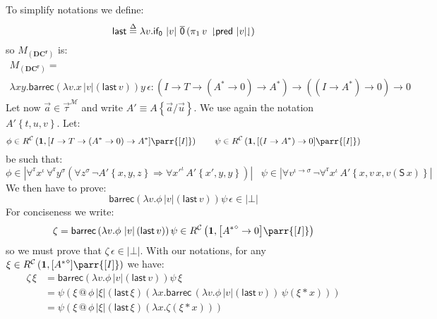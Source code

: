 \documentclass{CSML}
\makeatletter
\newcommand*\Def{\mathrel{\overset{\Delta}{=}}}
\newcommand*\SortA{\sigma}
\newcommand*\SortB{\tau}
\newcommand*\LogSortedTerm[2]{#1^{#2}}
\newcommand*\LogTermA{t}
\newcommand*\LogTermB{u}
\newcommand*\LogTermC{v}
\newcommand*\LogVarA{x}
\newcommand*\LogVarB{y}
\newcommand*\LogVarC{z}
\newcommand*\LogVarD{u}
\newcommand*\LogVarE{v}
\newcommand*\LogConst[1]{\mathsf{#1}}
\newcommand*\LogImp{\mathbin{\Rightarrow}}
\newcommand*\LogBot\bot
\newcommand*\LogForallRel{\forall^\mathrm{r}}
\newcommand*\LogFormA{A}
\newcommand*\LogSubst[1]{\left\{#1\right\}}
\newcommand*\ModM{\mathcal{M}}
\newcommand*\ModElemA{a}
\newcommand*\ModMInterp[1]{{#1}^\ModM}
\newcommand*\LmSortBot0
\newcommand*\LmSortTo\to
\newcommand*\LmSortA{T}
\newcommand*\LmTerm[2]{#1\mathrel{:}#2}
\newcommand*\LmVarA{x}
\newcommand*\LmVarB{y}
\newcommand*\LmVarE{v}
\newcommand*\LmConst[1]{\mathsf{#1}}
\newcommand*\LmProj{\pi}
\newcommand*\LmInterpForm[1]{{#1}^*}
\newcommand*\LmInterpAxiom[1]{M_{#1}}
\newcommand*\CatC{\mathcal{C}}
\newcommand*\CatR{R}
\newcommand*\CatRC{\CatExp{\CatR}{\CatC}}
\newcommand*\CatExp[2]{#1^{#2}}
\newcommand*\CatPar\parr
\newcommand*\CatRCHomA\phi
\newcommand*\CatRCHomB\psi
\newcommand*\CatRCHomC\zeta
\newcommand*\CatRCHomD\xi
\newcommand*\CatTerm{\mathbf{1}}
\newcommand*\CatInterpSort[1]{{\left[#1\right]}}
\newcommand*\RealVal[1]{\left|#1\right|}
\newcommand*\CASort\iota
\newcommand*\CASortList[1]{{#1}^\diamond}
\newcommand*\CALogS{\LogConst{S}}
\newcommand*\CAAxName[1]{{\bm{\scriptstyle(#1)}}}
\newcommand*\CADCName{\CAAxName{DC^r}}
\newcommand*\CADCSort[2]{\left(\CALmnSort\LmSortTo#1\LmSortTo\left(\LmInterpForm{#2}\LmSortTo\LmSortBot\right)\LmSortTo\LmInterpForm{#2}\right)\LmSortTo\left(\left(\CALmnSort\LmSortTo\LmInterpForm{#2}\right)\LmSortTo\LmSortBot\right)\LmSortTo\LmSortBot}
\newcommand*\CALmn[1]{\LmConst{\overline{#1}}}
\newcommand*\CALmnSort{I}
\newcommand*\CALmbarrec{\LmConst{barrec}}
\newcommand*\CALmifz{\LmConst{if_0}}
\newcommand*\CALmpred{\LmConst{pred}}
\newcommand*\CALmconcat{\mathbin{@}}
\newcommand*\CALmextend{\mathbin{*}}
\newcommand*\CALmnil{\epsilon}
\newcommand*\CALmlen[1]{\left|#1\right|}
\newcommand*\CALmind[2]{#1\,\downharpoonright\mkern-5mu#2\mkern-5mu\downharpoonleft}
\makeatother
\begin{document}
To simplify notations we define:
$$\LmConst{last}\Def\lambda\LmVarE.\CALmifz\,\CALmlen{\LmVarE}\,\CALmn{0}\left(\LmProj_1\,\CALmind{\LmVarE}{\CALmpred\,\CALmlen{\LmVarE}}\right)$$
so $\LmInterpAxiom{\CADCName}$ is:
\begin{multline*}\LmTerm{\LmInterpAxiom{\CADCName}=\\\lambda\LmVarA\LmVarB.\CALmbarrec\left(\lambda\LmVarE.\LmVarA\,\CALmlen{\LmVarE}\left(\LmConst{last}\,\LmVarE\right)\right)\LmVarB\,\CALmnil}{\CADCSort{\LmSortA}{\LogFormA}}\end{multline*}
Let now $\vec{\ModElemA}\in\ModMInterp{\vec{\SortB}}$ and write $\LogFormA'\equiv\LogFormA\LogSubst{\vec{\ModElemA}/\vec{\LogVarD}}$. We use again the notation $\LogFormA'\LogSubst{\LogTermA,\LogTermB,\LogTermC}$. Let:
$$\CatRCHomA\in\CatRC\left(\CatTerm,\CatInterpSort{\CALmnSort\LmSortTo\LmSortA\LmSortTo\left(\LmInterpForm{\LogFormA}\LmSortTo\LmSortBot\right)\LmSortTo\LmInterpForm{\LogFormA}}\CatPar\CatInterpSort{\CALmnSort}\right)\qquad\CatRCHomB\in\CatRC\left(\CatTerm,\CatInterpSort{\left(\CALmnSort\LmSortTo\LmInterpForm{\LogFormA}\right)\LmSortTo\LmSortBot}\CatPar\CatInterpSort{\CALmnSort}\right)$$
be such that:
$$\CatRCHomA\in\RealVal{\LogForallRel\LogSortedTerm{\LogVarA}{\CASort}\,\LogForallRel\LogSortedTerm{\LogVarB}{\SortA}\left(\forall\LogSortedTerm{\LogVarC}{\SortA}\,\neg\LogFormA'\LogSubst{\LogVarA,\LogVarB,\LogVarC}\LogImp\forall\LogSortedTerm{\LogVarA'}{\CASort}\,\LogFormA'\LogSubst{\LogVarA',\LogVarB,\LogVarB}\right)}\;\;\;\CatRCHomB\in\RealVal{\forall\LogSortedTerm{\LogVarE}{\CASort\to\SortA}\,\neg\LogForallRel\LogSortedTerm{\LogVarA}{\CASort}\,\LogFormA'\LogSubst{\LogVarA,\LogVarE\,\LogVarA,\LogVarE\left(\CALogS\,\LogVarA\right)}}$$
We then have to prove:
$$\CALmbarrec\left(\lambda\LmVarE.\CatRCHomA\,\CALmlen{\LmVarE}\left(\LmConst{last}\,\LmVarE\right)\right)\CatRCHomB\,\CALmnil\in\RealVal{\LogBot}$$
For conciseness we write:
$$\CatRCHomC=\CALmbarrec\left(\lambda\LmVarE.\CatRCHomA\,\CALmlen{\LmVarE}\left(\LmConst{last}\,\LmVarE\right)\right)\CatRCHomB\in\CatRC\left(\CatTerm,\CatInterpSort{\CASortList{\LmInterpForm{\LogFormA}}\LmSortTo\LmSortBot}\CatPar\CatInterpSort{\CALmnSort}\right)$$
so we must prove that $\CatRCHomC\,\CALmnil\in\RealVal{\LogBot}$. With our notations, for any $\CatRCHomD\in\CatRC\left(\CatTerm,\CatInterpSort{\CASortList{\LmInterpForm{\LogFormA}}}\CatPar\CatInterpSort{\CALmnSort}\right)$ we have:
\begin{align*}
\CatRCHomC\,\CatRCHomD&=\CALmbarrec\left(\lambda\LmVarE.\CatRCHomA\,\CALmlen{\LmVarE}\left(\LmConst{last}\,\LmVarE\right)\right)\CatRCHomB\,\CatRCHomD\\
&=\CatRCHomB\left(\CatRCHomD\CALmconcat\CatRCHomA\,\CALmlen{\CatRCHomD}\left(\LmConst{last}\,\CatRCHomD\right)\left(\lambda\LmVarA.\CALmbarrec\,\left(\lambda\LmVarE.\CatRCHomA\,\CALmlen{\LmVarE}\left(\LmConst{last}\,\LmVarE\right)\right)\,\CatRCHomB\left(\CatRCHomD\CALmextend\LmVarA\right)\right)\right)\\
&=\CatRCHomB\left(\CatRCHomD\CALmconcat\CatRCHomA\,\CALmlen{\CatRCHomD}\left(\LmConst{last}\,\CatRCHomD\right)\left(\lambda\LmVarA.\CatRCHomC\left(\CatRCHomD\CALmextend\LmVarA\right)\right)\right)
\end{align*}
\end{document}
